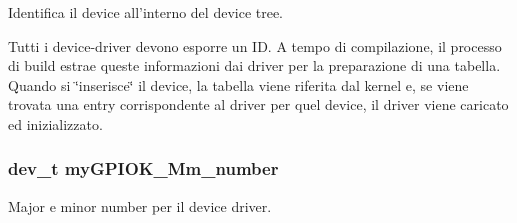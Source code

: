 Identifica il device all'interno del device tree. 

Tutti i device-\/driver devono esporre un I\+D. A tempo di compilazione, il processo di build estrae queste informazioni dai driver per la preparazione di una tabella. Quando si \char`\"{}inserisce\char`\"{} il device, la tabella viene riferita dal kernel e, se viene trovata una entry corrispondente al driver per quel device, il driver viene caricato ed inizializzato. \hypertarget{group___linux-_driver_ga434e034e4625b1949f0c626823870a39}{
\subsubsection[{my\+G\+P\+I\+O\+K\+\_\+\+Mm\+\_\+number}]{\setlength{\rightskip}{0pt plus 5cm}dev\+\_\+t my\+G\+P\+I\+O\+K\+\_\+\+Mm\+\_\+number\hspace{0.3cm}{\ttfamily [static]}}}\label{group___linux-_driver_ga434e034e4625b1949f0c626823870a39}


Major e minor number per il device driver. 

